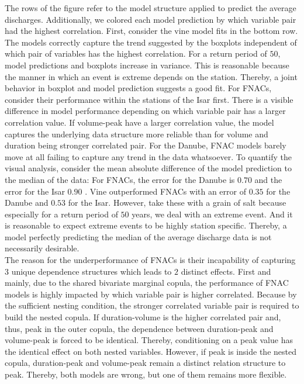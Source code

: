 \documentclass[
]{krantz}
\begin{document}
The rows of the figure refer to the model structure applied to predict the average discharges.
Additionally, we colored each model prediction by which variable pair had the highest correlation.
First, consider the vine model fits in the bottom row. The models
correctly capture the trend suggested by the boxplots independent of which pair of variables has the highest
correlation. For a return period of \(50\), model predictions and boxplots increase in variance.
This is reasonable because the manner in which an event is extreme depends on the station. Thereby, a joint
behavior in boxplot and model prediction suggests a good fit.
For FNACs, consider their performance within the stations of the Isar first. There is a visible
difference in model performance depending on which variable pair has a larger correlation value.
If volume-peak
have a larger correlation value,
the model captures the underlying data structure more reliable than for
volume and duration being stronger correlated pair.
For the Danube, FNAC models barely move at all failing to capture any trend in the data whatsoever.
To quantify the visual analysis, consider the mean absolute difference of the model prediction to the median
of the data: For FNACs, the error for the Danube is
\(0.70\)
and the error for the Isar
\(0.90\)
.
Vine outperformed FNACs with an error of
\(0.35\)
for the Danube and
\(0.53\)
for the Isar.
However,
take these with a grain of salt because especially for a return period of \(50\) years,
we deal with an extreme event.
And it is reasonable to expect extreme events to be highly station specific.
Thereby, a model perfectly predicting the median of the average discharge data is not necessarily desirable.\\
The reason for the underperformance of FNACs is their incapability of capturing \(3\) unique dependence structures
which leads to \(2\) distinct effects.
First and mainly, due to the shared bivariate marginal copula, the performance of FNAC models is
highly impacted by which variable pair is higher correlated. Because by the sufficient nesting condition,
the stronger correlated variable pair is required to build the nested copula.
If duration-volume is the higher correlated pair and, thus, peak in the outer copula,
the dependence between duration-peak and volume-peak is forced to be identical. Thereby, conditioning on
a peak value has the identical effect on both nested variables.
However, if peak is inside the nested copula, duration-peak and volume-peak remain a distinct
relation structure to peak. Thereby, both models are wrong, but one of them remains more flexible.\\
\end{document}
